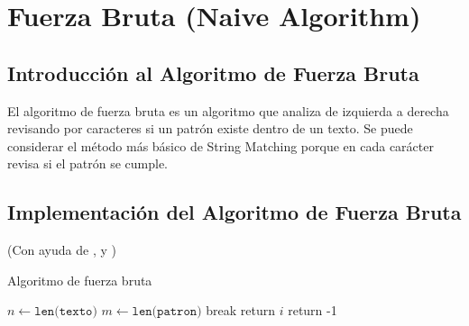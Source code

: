 \section*{Fuerza Bruta (Naive Algorithm)}

\subsection*{Introducción al Algoritmo de Fuerza Bruta}

\quad El algoritmo de fuerza bruta es un algoritmo que analiza de izquierda a derecha revisando por caracteres si un patrón existe dentro de un texto. Se puede considerar el método más básico de String Matching porque en cada carácter revisa si el patrón se cumple.

\subsection*{Implementación del Algoritmo de Fuerza Bruta}
(Con ayuda de \cite{coincidenciadecadenasdepython}, \cite{coronadosanz_2018} y \cite{pdfFB})

\begin{algorithm} [H]
    \caption{Algoritmo de fuerza bruta}\label{alg:FB}
    \begin{algorithmic} [1]
            \State $n \gets \texttt{len(texto)}$
            \State $m \gets \texttt{len(patron)}$
             
                 
                     
                        \State break
                    \EndIf
                \EndFor
                 
                    \State return $i$
                \EndIf
            \EndFor
            \State return -1 
        \EndProcedure
    \end{algorithmic}
\end{algorithm}


